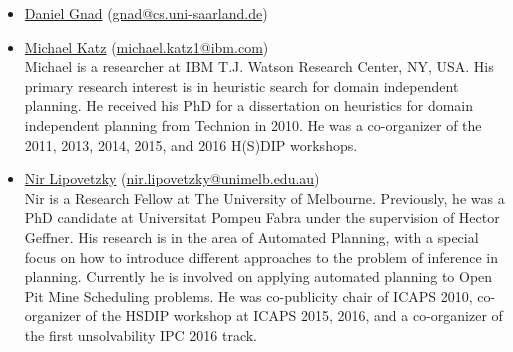 \documentclass[10pt]{article}
\begin{document}
\begin{itemize}




%

\item \href{http://}{Daniel Gnad}
  (\href{mailto:gnad@cs.uni-saarland.de}{gnad@cs.uni-saarland.de})\\

\item \href{https://resedit.watson.ibm.com/researcher/view.php?person=ibm-Michael.Katz1}{Michael Katz}
 (\href{mailto:michael.katz1@ibm.com}{michael.katz1@ibm.com})\\
 Michael is a researcher at IBM T.J. Watson Research Center, NY, USA. His
 primary research interest is in heuristic search for domain independent planning.
 He received his PhD for a dissertation on heuristics for domain independent
 planning from Technion in 2010.
 He was a co-organizer of the 2011, 2013, 2014, 2015, and 2016 H(S)DIP
 workshops.

\item \href{http://people.eng.unimelb.edu.au/nlipovetzky/}{Nir Lipovetzky}
  (\href{mailto:nir.lipovetzky@unimelb.edu.au}{nir.lipovetzky@unimelb.edu.au})\\
Nir is a Research Fellow at The University of Melbourne. Previously, he was a
PhD candidate at Universitat Pompeu Fabra under the supervision of Hector Geffner.
His research is in the area of Automated Planning, with a special focus on how
to introduce different approaches to the problem of inference in planning.
Currently he is involved on applying automated planning to Open Pit Mine
Scheduling problems. He was co-publicity chair of ICAPS 2010, co-organizer
of the HSDIP workshop at ICAPS 2015, 2016, and a co-organizer of the first unsolvability
IPC 2016 track.


\end{itemize}
\end{document}
